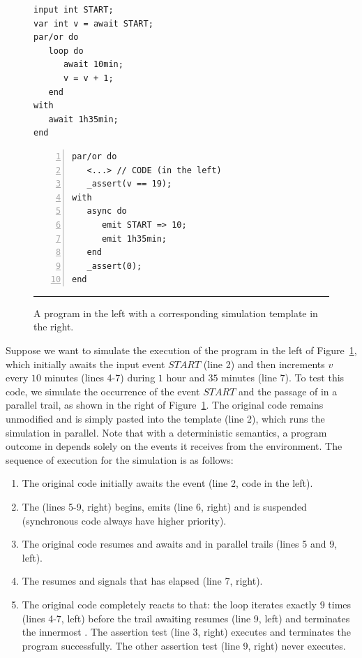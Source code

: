 \begin{figure}[t]
\begin{minipage}[t]{0.40\linewidth}
\begin{lstlisting}
input int START;
var int v = await START;
par/or do
   loop do
      await 10min;
      v = v + 1;
   end
with
   await 1h35min;
end
\end{lstlisting}
\end{minipage}
%
\begin{minipage}[t]{0.50\linewidth}
\begin{lstlisting}[numbers=left,xleftmargin=-0.5em]
par/or do
   <...> // CODE (in the left)
   _assert(v == 19);
with
   async do
      emit START => 10;
      emit 1h35min;
   end
   _assert(0);
end
\end{lstlisting}
\end{minipage}
\rule{14cm}{0.37pt}
\caption{
A program in the left with a corresponding simulation template in the right.
{\small %
}%
\label{lst.simul}
}
\end{figure}

Suppose we want to simulate the execution of the program in the left of
Figure~\ref{lst.simul}, which initially awaits the input event $START$ (line 2) 
and then increments $v$ every $10$ minutes (lines 4-7) during $1$ hour and $35$ 
minutes (line 7).
%
To test this code, we simulate the occurrence of the event $START$ and the 
passage of  in a parallel trail, as shown in the right of
Figure~\ref{lst.simul}.
%
The original code remains unmodified and is simply pasted into the template 
(line 2), which runs the simulation in parallel.
%
Note that with a deterministic semantics, a program outcome in \CEU depends 
solely on the events it receives from the environment.
%
The sequence of execution for the simulation is as follows:

{\small
\begin{enumerate}
\setlength{\itemsep}{0pt}
\item The original code initially awaits the event  (line 2, code 
in the left).
\item The  (lines 5-9, right) begins, emits  (line 
6, right) and is suspended (synchronous code always have higher priority).
\item The original code resumes and awaits  and  in 
parallel trails (lines 5 and 9, left).
\item The  resumes and signals that  has elapsed 
(line 7, right).
\item The original code completely reacts to that: the loop iterates exactly 
$9$ times (lines 4-7, left) before the trail awaiting  resumes 
(line 9, left) and terminates the innermost .
The assertion test (line 3, right) executes and terminates the program 
successfully.
The other assertion test (line 9, right) never executes.
\end{enumerate}
}

